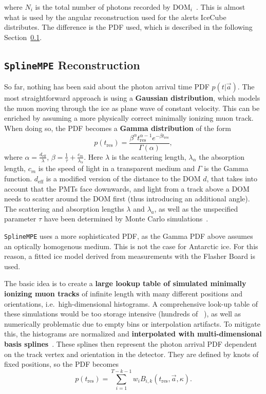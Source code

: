 where $N_i$ is the total number of photons recorded by $\text{DOM}_i$~\cite{Ahrens2004}. This is almost what is used by the angular reconstruction used for the alerts IceCube distributes. The difference is the PDF used, which is described in the following Section~\ref{spline_mpe}.

\subsection{\texttt{SplineMPE} Reconstruction}\label{spline_mpe}
So far, nothing has been said about the photon arrival time PDF $p(t|\vec{a})$. The most straightforward approach is using a \textbf{Gaussian distribution}, which models the muon moving through the ice as plane wave of constant velocity. This can be enriched by assuming a more physically correct minimally ionizing muon track. When doing so, the PDF becomes a \textbf{Gamma distribution} of the form
\begin{equation}
    p(t_\text{res}) = \frac{\beta^\alpha t_\text{res}^{\alpha-1} e^{-\beta t_\text{res}}}{\Gamma(\alpha)},
\end{equation}
where $\alpha=\frac{d_\text{eff}}{\lambda}$, $\beta=\frac{1}{\tau} + \frac{c_m}{\lambda_\alpha}$. Here $\lambda$ is the scattering length, $\lambda_\alpha$ the absorption length, $c_m$ is the speed of light in a transparent medium and $\Gamma$ is the Gamma function. $d_\text{eff}$ is a modified version of the distance to the DOM $d$, that takes into account that the PMTs face downwards, and light from a track above a DOM needs to scatter around the DOM first (thus introducing an additional angle). The scattering and absorption lengths $\lambda$ and $\lambda_a$, as well as the unspecified parameter $\tau$ have been determined by Monte Carlo simulations~.

\texttt{SplineMPE} uses a more sophisticated PDF, as the Gamma PDF above assumes an optically homogenous medium. This is not the case for Antarctic ice. For this reason, a fitted ice model derived from measurements with the Flasher Board is used.

The basic idea is to create a \textbf{large lookup table of simulated minimally ionizing muon tracks} of infinite length with many different positions and orientations, i.e.\ high-dimensional histograms. A comprehensive look-up table of these simulations would be too storage intensive (hundreds of \unit{\giga\byte}), as well as numerically problematic due to empty bins or interpolation artifacts. To mitigate this, the histograms are normalized and \textbf{interpolated with multi-dimensional basis splines}~. These splines then represent the photon arrival PDF dependent on the track vertex and orientation in the detector. They are defined by knots of fixed positions, so the PDF becomes
\begin{equation}
    p(t_\text{res}) = \sum_{i=1}^{T-k-1} w_i B_{i,k}(t_\text{res},\vec{a}, \kappa).
\end{equation}

